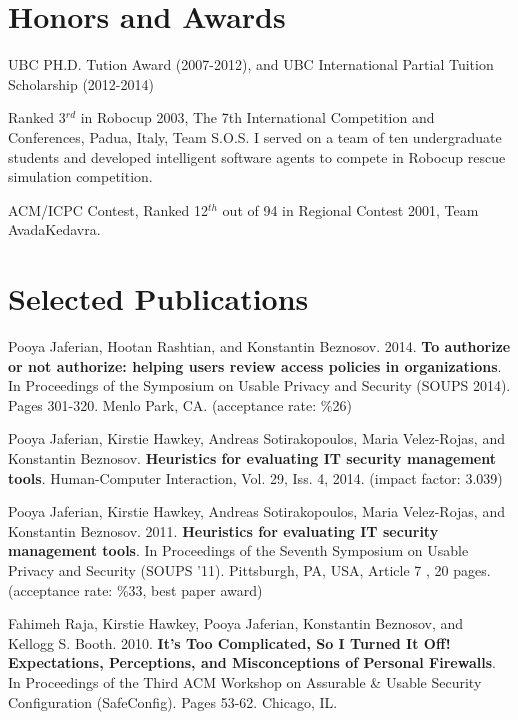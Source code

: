 \documentclass[margin]{res}
\begin{document}
\begin{resume}
\section{\sc Honors and Awards}
UBC PH.D. Tution Award (2007-2012), and UBC International Partial Tuition Scholarship (2012-2014)

Ranked 3$^{rd}$ in Robocup 2003, The 7th International Competition and Conferences, Padua, Italy, Team S.O.S.
I served on a team of ten undergraduate students and developed intelligent software agents to compete in Robocup rescue simulation competition. 

ACM/ICPC Contest, Ranked 12$^{th}$ out of 94 in Regional Contest 2001, Team AvadaKedavra.


\section{\sc Selected Publications}
Pooya Jaferian, Hootan Rashtian, and Konstantin Beznosov. 2014. \textbf{To authorize or not authorize: helping users review access policies in organizations}. In Proceedings of the Symposium on Usable Privacy and Security (SOUPS 2014). Pages 301-320. Menlo Park, CA. (acceptance rate: \%26)

Pooya Jaferian, Kirstie Hawkey, Andreas Sotirakopoulos, Maria Velez-Rojas, and Konstantin Beznosov. \textbf{Heuristics for evaluating IT security management tools}. Human-Computer Interaction, Vol. 29, Iss. 4, 2014. (impact factor: 3.039)

Pooya Jaferian, Kirstie Hawkey, Andreas Sotirakopoulos, Maria Velez-Rojas, and Konstantin Beznosov. 2011. \textbf{Heuristics for evaluating IT security management tools}. In Proceedings of the Seventh Symposium on Usable Privacy and Security (SOUPS '11). Pittsburgh, PA, USA, Article 7 , 20 pages. (acceptance rate: \%33, best paper award)

Fahimeh Raja, Kirstie Hawkey, Pooya Jaferian, Konstantin Beznosov, and Kellogg S. Booth. 2010. \textbf{It's Too Complicated, So I Turned It Off! Expectations, Perceptions, and Misconceptions of Personal Firewalls}. In Proceedings of the Third ACM Workshop on Assurable \& Usable Security Configuration (SafeConfig). Pages 53-62. Chicago, IL.


\end{resume}
\end{document}

